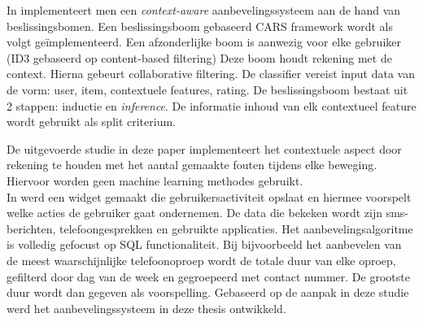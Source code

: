 In \citep{ref13} implementeert men een \textit{context-aware} aanbevelingssysteem aan de hand van beslissingsbomen.
Een beslissingsboom gebaseerd CARS framework wordt als volgt geïmplementeerd. Een afzonderlijke boom is aanwezig voor elke gebruiker (ID3 gebaseerd op content-based filtering) Deze boom houdt rekening met de context. Hierna gebeurt collaborative filtering. De classifier vereist input data van de vorm: user, item, contextuele features, rating. 
De beslissingsboom bestaat uit 2 stappen: inductie en \textit{inference}. De informatie inhoud van elk contextueel feature wordt gebruikt als split criterium.

De uitgevoerde studie in deze paper implementeert het contextuele aspect door rekening te houden met het aantal gemaakte fouten tijdens elke beweging. Hiervoor worden geen machine learning methodes gebruikt.\\

In \citep{ref23} werd een widget gemaakt die gebruikersactiviteit opslaat en hiermee voorspelt welke acties de gebruiker gaat ondernemen. De data die bekeken wordt zijn sms-berichten, telefoongesprekken en gebruikte applicaties. Het aanbevelingsalgoritme is volledig gefocust op SQL functionaliteit. Bij bijvoorbeeld het aanbevelen van de meest waarschijnlijke telefoonoproep wordt de totale duur van elke oproep, gefilterd door dag van de week en gegroepeerd met contact nummer. De grootste duur wordt dan gegeven als voorspelling.
Gebaseerd op de aanpak in deze studie werd het aanbevelingssysteem in deze thesis ontwikkeld.



